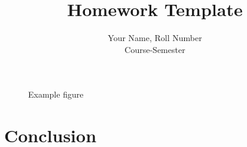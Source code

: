 \documentclass[a4paper,12pt]{article}
\begin{document}
 
 
\title{Homework Template}%
\author{Your Name, Roll Number\\ %
Course-Semester} %
 
\maketitle

\begin{figure}[htp]
\centering
\caption{Example figure}
\label{fig:example}
\end{figure}

\section{Conclusion}

\nocite{*}



\end{document}
